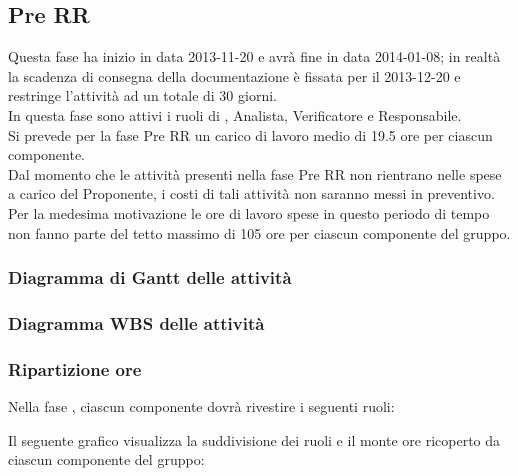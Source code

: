 \subsection{Pre RR}
Questa fase ha inizio in data 2013-11-20 e avrà fine in data 2014-01-08; in realtà la scadenza di consegna della documentazione è fissata per il 2013-12-20 e restringe l'attività ad un totale di 30 giorni.\\
In questa fase sono attivi i ruoli di , Analista, Verificatore e Responsabile.\\
Si prevede per la fase Pre RR un carico di lavoro medio di 19.5 ore per ciascun componente.\\
Dal momento che le attività presenti nella fase Pre RR non rientrano nelle spese a carico del Proponente, i costi di tali attività non saranno messi in preventivo.\\
Per la medesima motivazione le ore di lavoro spese in questo periodo di tempo non fanno parte del tetto massimo di 105 ore per ciascun componente del gruppo.

\subsubsection{Diagramma di Gantt delle attività}

\newpage
\subsubsection{Diagramma WBS delle attività}

\newpage
\subsubsection{Ripartizione ore}

\newpage
Nella fase , ciascun componente dovrà rivestire i seguenti ruoli:

Il seguente grafico visualizza la suddivisione dei ruoli e il monte ore ricoperto da ciascun componente del gruppo:
